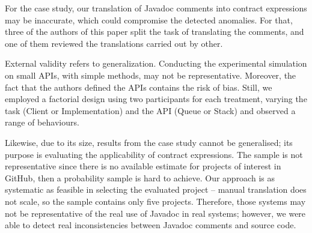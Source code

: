 For the case study, our translation of Javadoc comments into contract expressions may be inaccurate, which could compromise the detected anomalies. For that, three of the authors of this paper split the task of translating the comments, and one of them reviewed the translations carried out by other. 

External validity refers to generalization. 
Conducting the experimental simulation on small APIs, with simple methods, may not be representative. Moreover, the fact that the authors defined the APIs contains the risk of bias. Still, we employed a factorial design using two participants for each treatment, varying the task (Client or Implementation) and the API (Queue or Stack) and observed a range of behaviours. 

Likewise, due to its size, results from the case study cannot be generalised; its purpose is evaluating the applicability of contract expressions.
The sample is not representative since there is no available estimate for projects of interest in GitHub, then a probability sample is hard to achieve. 
Our approach is as systematic as feasible in selecting the evaluated project -- manual translation does not scale, so the sample contains only five projects.
Therefore, those systems may not be representative of the real use of Javadoc in real systems; however, we were able to detect real inconsistencies between Javadoc comments and source code.



